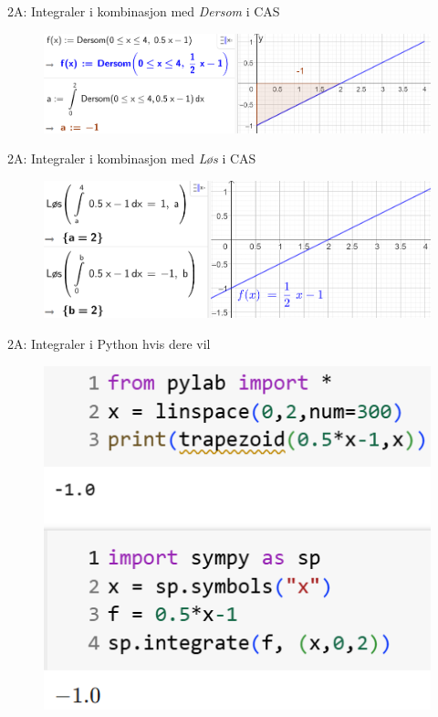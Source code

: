 \blueheader
\begin{frame}[fragile]{2A: Integraler i kombinasjon med \emph{Dersom} i CAS}
\begin{figure}
    \centering
    \includegraphics[width=\linewidth]{R2-K2A-13.png}
\end{figure}
\end{frame}

\blueheader
\begin{frame}[fragile]{2A: Integraler i kombinasjon med \emph{Løs} i CAS}
\begin{figure}
    \centering
    \includegraphics[width=\linewidth]{R2-K2A-12.png}
\end{figure}
\end{frame}

\greenheader
\begin{frame}[fragile]{2A: Integraler i Python hvis dere vil}
    \warn
\begin{figure}
    \centering
    \includegraphics[width=0.5\linewidth]{R2-K2A-14.png}
\end{figure}
\end{frame}


